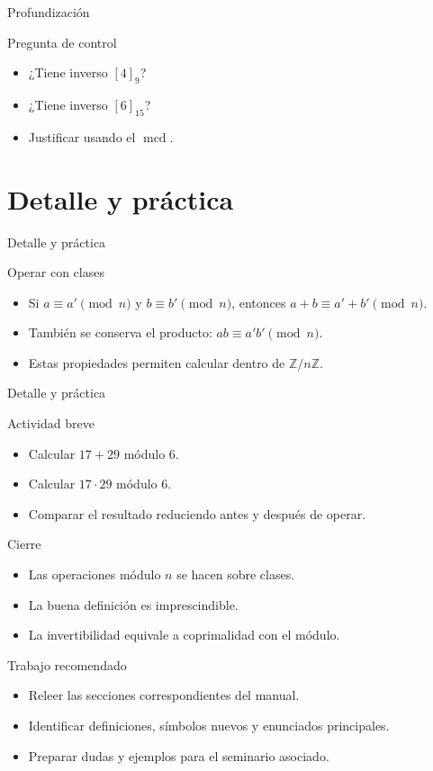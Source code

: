 \documentclass[aspectratio=169,11pt]{beamer}
\newcommand{\mcd}{\operatorname{mcd}}
\begin{document}
\begin{frame}{Profundización}
\begin{block}{Pregunta de control}
\begin{itemize}
  \item ¿Tiene inverso \([4]_{9}\)?
  \item ¿Tiene inverso \([6]_{15}\)?
  \item Justificar usando el \(\mcd\).
\end{itemize}
\end{block}
\end{frame}


\section{Detalle y práctica}

\begin{frame}{Detalle y práctica}
\begin{block}{Operar con clases}
\begin{itemize}
  \item Si \(a\equiv a'\pmod n\) y \(b\equiv b'\pmod n\), entonces \(a+b\equiv a'+b'\pmod n\).
  \item También se conserva el producto: \(ab\equiv a'b'\pmod n\).
  \item Estas propiedades permiten calcular dentro de \(\mathbb{Z}/n\mathbb{Z}\).
\end{itemize}
\end{block}
\end{frame}

\begin{frame}{Detalle y práctica}
\begin{block}{Actividad breve}
\begin{itemize}
  \item Calcular \(17+29\) módulo \(6\).
  \item Calcular \(17\cdot 29\) módulo \(6\).
  \item Comparar el resultado reduciendo antes y después de operar.
\end{itemize}
\end{block}
\end{frame}

\begin{frame}{Cierre}
\begin{itemize}
  \item Las operaciones módulo \(n\) se hacen sobre clases.
  \item La buena definición es imprescindible.
  \item La invertibilidad equivale a coprimalidad con el módulo.
\end{itemize}
\end{frame}

\begin{frame}{Trabajo recomendado}
\begin{itemize}
  \item Releer las secciones correspondientes del manual.
  \item Identificar definiciones, símbolos nuevos y enunciados principales.
  \item Preparar dudas y ejemplos para el seminario asociado.
\end{itemize}
\end{frame}
\end{document}
